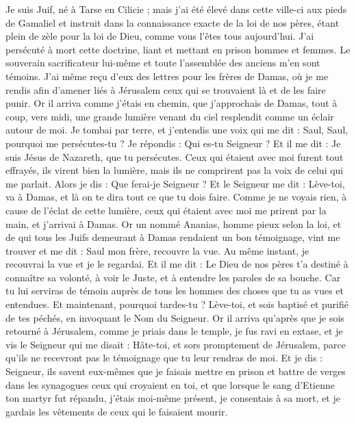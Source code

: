 \begin{multicols}{2}
Je suis Juif, né à Tarse en Cilicie ; mais j'ai été élevé dans cette ville-ci aux pieds de Gamaliel et instruit dans la connaissance exacte de la loi de nos pères, étant plein de zèle pour la loi de Dieu, comme vous l'êtes tous aujourd'hui.
J'ai persécuté à mort cette doctrine, liant et mettant en prison hommes et femmes.
Le souverain sacrificateur lui-même et toute l'assemblée des anciens m'en sont témoins. J'ai même reçu d'eux des lettres pour les frères de Damas, où je me rendis afin d'amener liés à Jérusalem ceux qui se trouvaient là et de les faire punir.
Or il arriva comme j'étais en chemin, que j'approchais de Damas, tout à coup, vers midi, une grande lumière venant du ciel resplendit comme un éclair autour de moi.
Je tombai par terre, et j'entendis une voix qui me dit : Saul, Saul, pourquoi me persécutes-tu ?
Je répondis : Qui es-tu Seigneur ? Et il me dit : Je suis Jésus de Nazareth, que tu persécutes.
Ceux qui étaient avec moi furent tout effrayés, ils virent bien la lumière, mais ils ne comprirent pas la voix de celui qui me parlait. Alors je dis : Que ferai-je Seigneur ?
Et le Seigneur me dit : Lève-toi, va à Damas, et là on te dira tout ce que tu dois faire.
Comme je ne voyais rien, à cause de l'éclat de cette lumière, ceux qui étaient avec moi me prirent par la main, et j'arrivai à Damas.
Or un nommé Ananias, homme pieux selon la loi, et de qui tous les Juifs demeurant à Damas rendaient un bon témoignage, vint me trouver
et me dit : Saul mon frère, recouvre la vue. Au même instant, je recouvrai la vue et je le regardai.
Et il me dit : Le Dieu de nos pères t'a destiné à connaître sa volonté, à voir le Juste, et à entendre les paroles de sa bouche.
Car tu lui serviras de témoin auprès de tous les hommes des choses que tu as vues et entendues.
Et maintenant, pourquoi tardes-tu ? Lève-toi, et sois baptisé et purifié de tes péchés, en invoquant le Nom du Seigneur.
Or il arriva qu'après que je sois retourné à Jérusalem, comme je priais dans le temple, je fus ravi en extase,
et je vis le Seigneur qui me disait : Hâte-toi, et sors promptement de Jérusalem, parce qu'ils ne recevront pas le témoignage que tu leur rendras de moi.
Et je dis : Seigneur, ils savent eux-mêmes que je faisais mettre en prison et battre de verges dans les synagogues ceux qui croyaient en toi,
et que lorsque le sang d'Etienne ton martyr fut répandu, j'étais moi-même présent, je consentais à sa mort, et je gardais les vêtements de ceux qui le faisaient mourir.

\end{multicols}

